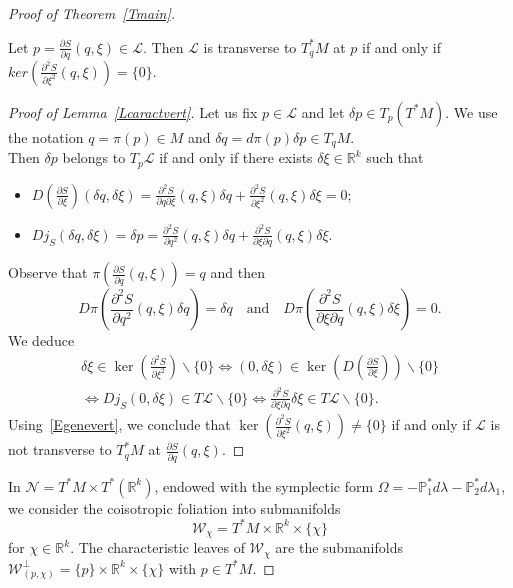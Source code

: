 \documentclass[AHL, Unicode, longabstracts, published]{cedram}
\newcommand*\cl{\mathcal{L}}
\newcommand*\cw{\mathcal{W}}
\newcommand*\cal{\mathcal}
\newcommand*\R{\mathbb{R}}
\newcommand{\bbP}{\mathbb{P}}
\begin{document}
\begin{proof}[Proof of Theorem~\ref{Tmain}]

\begin{lemm}\label{Lcaractvert}
Let $p=\frac{\partial S}{\partial q}(q, \xi)\in \cl$. Then $\cl$ is transverse to $T^*_qM$ at $p$ if and only if$ker (\frac{\partial^2 S}{\partial \xi^2}(q, \xi))=\{ 0\}$.
\end{lemm}
\begin{proof}[Proof of Lemma~\ref{Lcaractvert}]
Let us fix $p\in \cl$ and let $\delta p\in T_p(T^*M)$. We use the notation $q=\pi(p)\in M$ and $\delta q= d\pi(p)\delta p\in T_qM$.\\
Then $\delta p$ belongs to $T_{p}\cl$ if and only if there exists $\delta\xi\in \R^k$ such that
\begin{itemize}
\item ${D(\frac{\partial S}{\partial \xi})(\delta q, \delta \xi)=}\frac{\partial^2 S}{\partial q\partial \xi}(q, \xi)\delta q+\frac{\partial^2 S}{\partial \xi^2}(q, \xi)\delta \xi=0$;
\item ${ Dj_S(\delta q, \delta \xi)=}\delta p=\frac{\partial^2 S}{\partial q^2}(q, \xi)\delta q+\frac{\partial^2 S}{\partial \xi\partial q}(q, \xi)\delta \xi$.
\end{itemize}
Observe that $\pi(\frac{\partial S}{\partial q}(q, \xi))=q$ and then
\begin{equation}\label{Egenevert}
D\pi\left(\frac{\partial^2S}{\partial q^2}(q, \xi)\delta q\right)=\delta q\quad\text{and}\quad D\pi\left(\frac{\partial^2S}{\partial \xi\partial q}(q, \xi)\delta \xi\right)=0.
\end{equation}
We deduce
\begin{gather*}
\delta\xi\in\ker \left(\frac{\partial^2S}{\partial\xi^2}\right)\backslash\{ 0\}\Longleftrightarrow(0, \delta \xi)\in \ker\left(D\left(\frac{\partial S}{\partial \xi}\right)\right)\backslash\{ 0\}
\\
\Longleftrightarrow Dj_S(0, \delta \xi)\in T\cl\backslash\{ 0\}\Longleftrightarrow\frac{\partial^2S}{\partial \xi\partial q}\delta\xi\in T\cl\backslash\{0\}.
\end{gather*}
Using~\eqref{Egenevert}, we conclude that $\ker (\frac{\partial^2 S}{\partial \xi^2}(q, \xi))\neq\{ 0\}$ if and only if $\cl$ is not transverse to $T^*_qM$ at $\frac{\partial S}{\partial q}(q, \xi)$.
\end{proof}

In ${\cal N}=T^*M\times T^*(\R^k)$, endowed with the symplectic form $\Omega${$=-\bbP_1^*d\lambda-\bbP_2^*d\lambda_1$}, we consider the coisotropic foliation into submanifolds
\[
\cw_\chi=T^*M\times \R^k\times \{\chi\}
\]
for $\chi\in \R^k$. The characteristic leaves of $\cw_\chi$ are the submanifolds $\cw^\bot_{(p,\chi)}=\{ p\}\times \R^k\times \{\chi\}$ with $ p\in T^*M$.




\end{proof}
\end{document}
